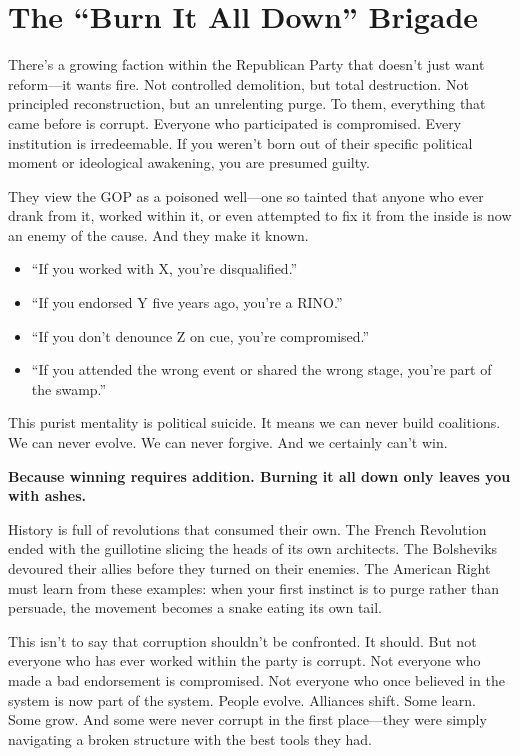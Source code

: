 \section{The ``Burn It All Down'' Brigade}

There’s a growing faction within the Republican Party that doesn’t just want reform—it wants fire. Not controlled demolition, but total destruction. Not principled reconstruction, but an unrelenting purge. To them, everything that came before is corrupt. Everyone who participated is compromised. Every institution is irredeemable. If you weren’t born out of their specific political moment or ideological awakening, you are presumed guilty.

They view the GOP as a poisoned well—one so tainted that anyone who ever drank from it, worked within it, or even attempted to fix it from the inside is now an enemy of the cause. And they make it known.

\begin{itemize}
    \item ``If you worked with X, you’re disqualified.''
    \item ``If you endorsed Y five years ago, you’re a RINO.''
    \item ``If you don’t denounce Z on cue, you’re compromised.''
    \item ``If you attended the wrong event or shared the wrong stage, you're part of the swamp.''
\end{itemize}

This purist mentality is political suicide. It means we can never build coalitions. We can never evolve. We can never forgive. And we certainly can’t win. 

\textbf{Because winning requires addition. Burning it all down only leaves you with ashes.}

History is full of revolutions that consumed their own. The French Revolution ended with the guillotine slicing the heads of its own architects. The Bolsheviks devoured their allies before they turned on their enemies. The American Right must learn from these examples: when your first instinct is to purge rather than persuade, the movement becomes a snake eating its own tail.

This isn’t to say that corruption shouldn’t be confronted. It should. But not everyone who has ever worked within the party is corrupt. Not everyone who made a bad endorsement is compromised. Not everyone who once believed in the system is now part of the system. People evolve. Alliances shift. Some learn. Some grow. And some were never corrupt in the first place—they were simply navigating a broken structure with the best tools they had.

